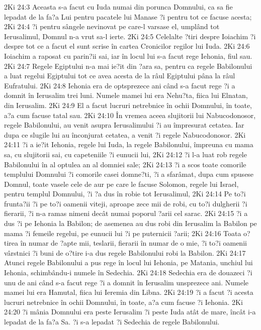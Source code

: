 2Ki 24:3  Aceasta s-a facut cu Iuda numai din porunca Domnului, ca sa fie lepadat de la fa?a Lui pentru pacatele lui Manase ?i pentru tot ce facuse acesta;
2Ki 24:4  ?i pentru sângele nevinovat pe care-l varsase el, umplând tot Ierusalimul, Domnul n-a vrut sa-l ierte.
2Ki 24:5  Celelalte ?tiri despre Ioiachim ?i despre tot ce a facut el sunt scrise în cartea Cronicilor regilor lui Iuda.
2Ki 24:6  Ioiachim a raposat cu parin?ii sai, iar în locul lui s-a facut rege Iehonia, fiul sau.
2Ki 24:7  Regele Egiptului n-a mai ie?it din ?ara sa, pentru ca regele Babilonului a luat regelui Egiptului tot ce avea acesta de la râul Egiptului pâna la râul Eufratului.
2Ki 24:8  Iehonia era de optsprezece ani când s-a facut rege ?i a domnit în Ierusalim trei luni. Numele mamei lui era Nehu?ta, fiica lui Elnatan, din Ierusalim.
2Ki 24:9  El a facut lucruri netrebnice în ochii Domnului, în toate, a?a cum facuse tatal sau.
2Ki 24:10  În vremea aceea slujitorii lui Nabucodonosor, regele Babilonului, au venit asupra Ierusalimului ?i au împresurat cetatea. Iar dupa ce slugile lui au înconjurat cetatea, a venit ?i regele Nabucodonosor.
2Ki 24:11  ?i a ie?it Iehonia, regele lui Iuda, la regele Babilonului, împreuna cu mama sa, cu slujitorii sai, cu capeteniile ?i eunucii lui,
2Ki 24:12  ?i l-a luat rob regele Babilonului în al optulea an al domniei sale;
2Ki 24:13  ?i a scos toate comorile templului Domnului ?i comorile casei domne?ti, ?i a sfarâmat, dupa cum spusese Domnul, toate vasele cele de aur pe care le facuse Solomon, regele lui Israel, pentru templul Domnului, ?i ?a dus în robie tot Ierusalimul,
2Ki 24:14  Pe to?i frunta?ii ?i pe to?i oamenii viteji, aproape zece mii de robi, cu to?i dulgherii ?i fierarii, ?i n-a ramas nimeni decât numai poporul ?arii cel sarac.
2Ki 24:15  ?i a dus ?i pe Iehonia la Babilon; de asemenea au dus robi din Ierusalim la Babilon pe mama ?i femeile regelui, pe eunucii lui ?i pe puternicii ?arii;
2Ki 24:16  Toata o?tirea în numar de ?apte mii, teslarii, fierarii în numar de o mie, ?i to?i oamenii vârstnici ?i buni de o?tire i-a dus regele Babilonului robi la Babilon.
2Ki 24:17  Atunci regele Babilonului a pus rege în locul lui Iehonia, pe Matania, unchiul lui Iehonia, schimbându-i numele în Sedechia.
2Ki 24:18  Sedechia era de douazeci ?i unu de ani când s-a facut rege ?i a domnit în Ierusalim unsprezece ani. Numele mamei lui era Hamutal, fiica lui Ieremia din Libna.
2Ki 24:19  ?i a facut ?i acesta lucruri netrebnice în ochii Domnului, în toate, a?a cum facuse ?i Iehonia.
2Ki 24:20  ?i mânia Domnului era peste Ierusalim ?i peste Iuda atât de mare, încât i-a lepadat de la fa?a Sa. ?i s-a lepadat ?i Sedechia de regele Babilonului.
